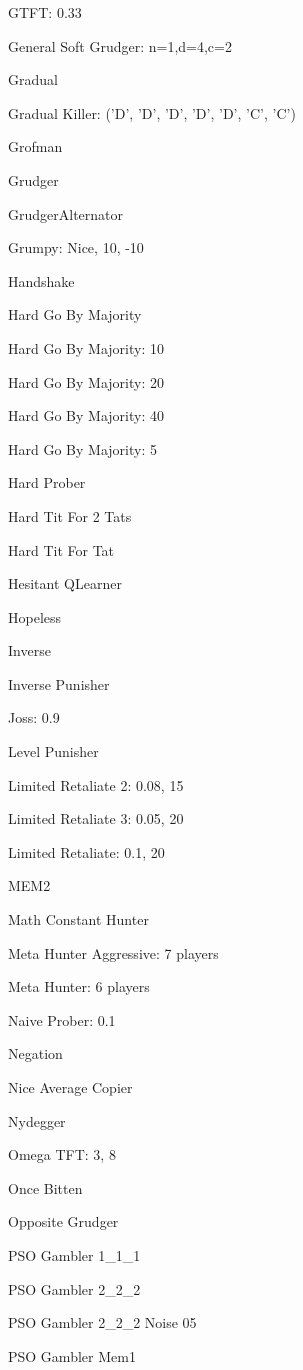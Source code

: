 \item GTFT: 0.33
\item General Soft Grudger: n=1,d=4,c=2
\item Gradual
\item Gradual Killer: ('D', 'D', 'D', 'D', 'D', 'C', 'C')
\item Grofman
\item Grudger
\item GrudgerAlternator
\item Grumpy: Nice, 10, -10
\item Handshake
\item Hard Go By Majority
\item Hard Go By Majority: 10
\item Hard Go By Majority: 20
\item Hard Go By Majority: 40
\item Hard Go By Majority: 5
\item Hard Prober
\item Hard Tit For 2 Tats
\item Hard Tit For Tat
\item Hesitant QLearner
\item Hopeless
\item Inverse
\item Inverse Punisher
\item Joss: 0.9
\item Level Punisher
\item Limited Retaliate 2: 0.08, 15
\item Limited Retaliate 3: 0.05, 20
\item Limited Retaliate: 0.1, 20
\item MEM2
\item Math Constant Hunter
\item Meta Hunter Aggressive: 7 players
\item Meta Hunter: 6 players
\item Naive Prober: 0.1
\item Negation
\item Nice Average Copier
\item Nydegger
\item Omega TFT: 3, 8
\item Once Bitten
\item Opposite Grudger
\item PSO Gambler 1\_1\_1
\item PSO Gambler 2\_2\_2
\item PSO Gambler 2\_2\_2 Noise 05
\item PSO Gambler Mem1
